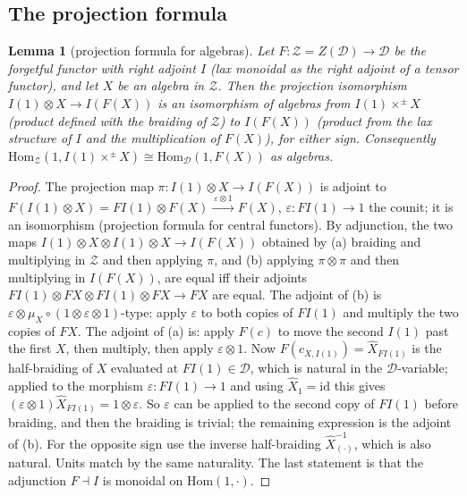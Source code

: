 \documentclass[11pt]{article}
\newtheorem{lemma}[theorem]{Lemma}
\theoremstyle{definition}
\theoremstyle{remark}
\begin{document}
\subsection{The projection formula}
\begin{lemma}[projection formula for algebras]\label{lem:projalg}
Let $F\colon\mathcal Z=Z(\mathcal D)\to\mathcal D$ be the forgetful functor with right adjoint $I$ (lax monoidal as the right adjoint of a tensor functor), and let $X$ be an algebra in $\mathcal Z$. Then the projection isomorphism $I(1)\otimes X\to I(F(X))$ is an isomorphism of algebras from $I(1)\times^{\pm}X$ (product defined with the braiding of $\mathcal Z$) to $I(F(X))$ (product from the lax structure of $I$ and the multiplication of $F(X)$), for either sign. Consequently $\mathrm{Hom}_{\mathcal Z}(1,I(1)\times^\pm X)\cong\mathrm{Hom}_{\mathcal D}(1,F(X))$ as algebras.
\end{lemma}
\begin{proof}
The projection map $\pi\colon I(1)\otimes X\to I(F(X))$ is adjoint to $F(I(1)\otimes X)=F I(1)\otimes F(X)\xrightarrow{\ \varepsilon\otimes1\ }F(X)$, $\varepsilon\colon FI(1)\to1$ the counit; it is an isomorphism (projection formula for central functors). By adjunction, the two maps $I(1)\otimes X\otimes I(1)\otimes X\to I(F(X))$ obtained by (a) braiding and multiplying in $\mathcal Z$ and then applying $\pi$, and (b) applying $\pi\otimes\pi$ and then multiplying in $I(F(X))$, are equal iff their adjoints $FI(1)\otimes FX\otimes FI(1)\otimes FX\to FX$ are equal. The adjoint of (b) is $\varepsilon\otimes\mu_X\circ(1\otimes\varepsilon\otimes 1)$-type: apply $\varepsilon$ to both copies of $FI(1)$ and multiply the two copies of $FX$. The adjoint of (a) is: apply $F(c)$ to move the second $I(1)$ past the first $X$, then multiply, then apply $\varepsilon\otimes1$. Now $F(c_{X,I(1)})=\widehat X_{FI(1)}$ is the half-braiding of $X$ evaluated at $F I(1)\in\mathcal D$, which is natural in the $\mathcal D$-variable; applied to the morphism $\varepsilon\colon FI(1)\to1$ and using $\widehat X_1=\mathrm{id}$ this gives $(\varepsilon\otimes1)\widehat X_{FI(1)}=1\otimes\varepsilon$. So $\varepsilon$ can be applied to the second copy of $FI(1)$ before braiding, and then the braiding is trivial; the remaining expression is the adjoint of (b). For the opposite sign use the inverse half-braiding $\widehat X^{-1}_{(\cdot)}$, which is also natural. Units match by the same naturality. The last statement is that the adjunction $F\dashv I$ is monoidal on $\mathrm{Hom}(1,\cdot)$.
\end{proof}
\end{document}
